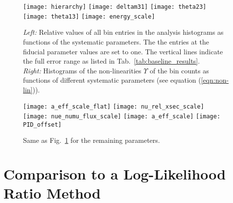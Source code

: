 \begin{figure}[p]
 \centering
 \texttt{[image: hierarchy]}
 \texttt{[image: deltam31]}
 \texttt{[image: theta23]}
 \texttt{[image: theta13]}
 \texttt{[image: energy\_scale]}
 \caption{\emph{Left:} Relative values of all bin entries in the analysis
  histograms as functions of the systematic parameters. The the entries at the 
  fiducial parameter values are set to one. The vertical lines indicate the full
  error range as listed in Tab.~\ref{tab:baseline_results}. \\
  \emph{Right:} Histograms of the non-linearities $\Upsilon$ of the bin counts
  as functions of different systematic parameters (see equation
  (\ref{eqn:non-lin})).}
 \label{fig:nonlinearities1}
\end{figure}

\begin{figure}[p]
 \centering
 \texttt{[image: a\_eff\_scale\_flat]}
 \texttt{[image: nu\_rel\_xsec\_scale]}
 \texttt{[image: nue\_numu\_flux\_scale]}
 \texttt{[image: a\_eff\_scale]}
 \texttt{[image: PID\_offset]}
 \caption{Same as Fig.~\ref{fig:nonlinearities1} for the remaining parameters.}
 \label{fig:nonlinearities2}
\end{figure}

\section*{\thesection\enskip Comparison to a 
Log-Likelihood Ratio Method}
\label{app:LLR}

